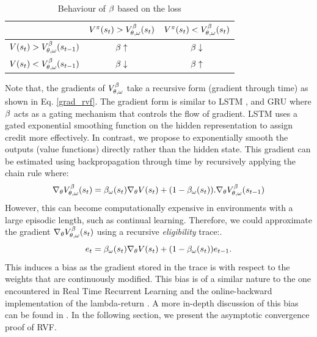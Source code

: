 \begin{table}[h]
\caption{Behaviour of $\beta$ based on the loss}
\centering
\begin{tabular}{c|c c } 
  & \small{$V^{\pi}(s_t)>V^{\beta}_{\theta,\omega}(s_t)$} & \small{$V^{\pi}(s_t)<V^{\beta}_{\theta,\omega}(s_t)$} \\ 
   \hline
 \small{$V(s_t)>V^{\beta}_{\theta,\omega}(s_{t-1})$} & $\beta \uparrow$ &  $\beta \downarrow$ \\ 
 \small{$V(s_t)<V^{\beta}_{\theta,\omega}(s_{t-1})$} & $\beta \downarrow$ & $\beta \uparrow$  \\ 
\end{tabular}
\vspace{7pt}
\label{sample-table}
\end{table}

Note that, the gradients of $V^{\beta}_{\theta,\omega}$ take a recursive form (gradient through time) as shown in Eq. \ref{grad_rvf}. The gradient form is similar to LSTM \citep{hochreiter1997long}, and GRU \citep{chung2014empirical} where $\beta$ acts as a gating mechanism that controls the flow of gradient. LSTM uses a gated exponential smoothing function on the hidden representation to assign credit more effectively. In contrast, we propose to exponentially smooth the outputs (value functions) directly rather than the hidden state. This gradient can be estimated using backpropagation through time by recursively applying the chain rule where:
 \begin{equation}
\label{grad_rvf}
\nabla_{\theta} V^{\beta}_{\theta,\omega} (s_t) = \beta_{\omega}(s_t) \nabla_{\theta} V(s_t) + (1-\beta_{\omega}(s_t)). \nabla_{\theta} V^{\beta}_{\theta,\omega}(s_{t-1})
\end{equation}
However, this can become computationally expensive in environments with a large episodic length, such as continual learning. Therefore, we could approximate the gradient $\nabla_{\theta}V^{\beta}_{\theta,\omega}(s_{t})$ using a recursive \emph{eligibility} trace:.
\begin{equation}
\label{trace}
    e_t = \beta_{\omega}(s_t) \nabla_{\theta} V (s_t) + (1-\beta_{\omega}(s_t)) e_{t-1}.
\end{equation}
This induces a bias as the gradient stored in the trace is with respect to the weights that are continuously modified. This bias is of a similar nature to the one encountered in Real Time Recurrent Learning \citep{williams1995gradient} and the online-backward implementation of the lambda-return \citep{sutton1985temporal}. A more in-depth discussion of this bias can be found in \citep{seijen2014true, williams1995gradient}.
In the following section, we present the asymptotic convergence proof of RVF.

